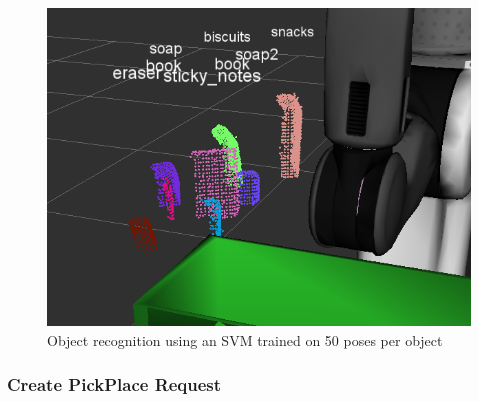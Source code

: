 \documentclass{article}
\begin{document}
\begin{figure}[H]
    \includegraphics[width=\linewidth]{pr2objrec.png}
    \caption{Object recognition using an SVM trained on 50 poses per object}
    \label{fig:pr2objrec}
\end{figure}

\subsubsection{Create PickPlace Request}

\end{document}
